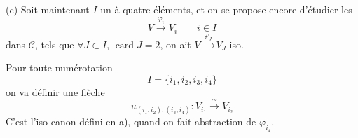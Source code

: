 \documentclass[11pt,a4paper]{article}
\begin{document}
(c) Soit maintenant $I$ un  à quatre éléments, et \struck{\ill{}} on se propose encore d'étudier les
\[
V \xrightarrow{\ \varphi_i\ } V_i \qquad i \in I
\]
dans $\mathcal{C}$, tels que $\forall J \subset I$, $\operatorname{card} J = 2$, on ait $V \xrightarrow{\ \varphi_J\ } V_J$ iso.

Pour toute  numérotation
\[
I = \{ i_1, i_2, i_3, i_4 \}
\]
on va définir une flèche
\[
u_{(i_1, i_2), (i_3, i_4)} : V_{i_1} \xrightarrow{\ \sim\ } V_{i_2} \tag{1}
\]
C'est l'iso canon défini en a), quand on fait abstraction de $\varphi_{i_4}$.
\end{document}
